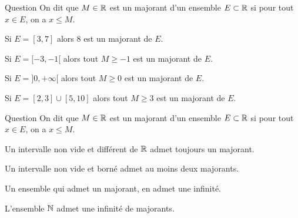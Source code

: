 \begin{multi}[multiple,feedback=
{Tracer les intervalles sur la droite réelle pour mieux comprendre. Les majorants d'un ensemble sont alors tous les réels "à droite" de l'ensemble.
}]{Question}
On dit que \(M \in \mathbb{R}\) est un majorant d'un ensemble \(E \subset \mathbb{R}\) si pour tout \(x\in E\), on a \(x \le M\).

    \item* Si \(E = [3,7]\) alors \(8\) est un majorant de \(E\).
    \item* Si \(E = [-3,-1[\) alors tout \(M \ge -1\) est un majorant de \(E\).
    \item Si \(E = ]0,+\infty[\) alors tout \(M \ge 0\) est un majorant de \(E\).
    \item Si \(E = [2,3] \cup [5,10]\) alors tout \(M \ge 3\) est un majorant de \(E\).
\end{multi}


\begin{multi}[multiple,feedback=
{L'ensemble des majorants (s'il est non vide) est du type \([M,+\infty[\).
}]{Question}
On dit que \(M \in \mathbb{R}\) est un majorant d'un ensemble \(E \subset \mathbb{R}\) si pour tout \(x\in E\), on a \(x \le M\).

    \item Un intervalle non vide et différent de \(\mathbb{R}\) admet toujours un majorant.
    \item* Un intervalle non vide et borné admet au moins deux majorants.
    \item* Un ensemble qui admet un majorant, en admet une infinité.
    \item L'ensemble \(\mathbb{N}\) admet une infinité de majorants.
\end{multi}

